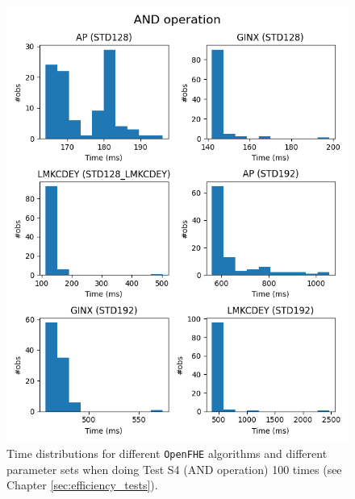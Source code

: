 \begin{figure}[ht]
    \centering
    \includegraphics[width=\textwidth]{data/figures/AND_operation_distributions_1.png}
    \caption{Time distributions for different \texttt{OpenFHE} algorithms and different parameter sets when doing Test S4 (AND operation) 100 times (see Chapter \ref{sec:efficiency_tests}).}
    \label{fig:distr_and1}
\end{figure}


